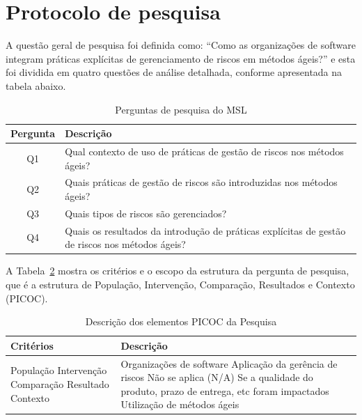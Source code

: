 \documentclass[
	12pt,
	openright,
	twoside,
	a4paper,
	english,
	brazil
	]{abntex2}
\begin{document}
\section{Protocolo de pesquisa}

A questão geral de pesquisa foi definida como: “Como as organizações de software integram práticas explícitas de gerenciamento de riscos em métodos ágeis?” e esta foi dividida em quatro questões de análise detalhada, conforme apresentada na tabela abaixo.

\begin{table}[h!]
  \caption{Perguntas de pesquisa do MSL}
  \centering
  \begin{tabular}{|c|p{10cm}|}
  \hline
  \textbf{Pergunta} & \textbf{Descrição} \\ \hline
  Q1 & Qual contexto de uso de práticas de gestão de riscos nos métodos ágeis? \\ \hline
  Q2 & Quais práticas de gestão de riscos são introduzidas nos métodos ágeis? \\ \hline
  Q3 & Quais tipos de riscos são gerenciados? \\ \hline
  Q4 & Quais os resultados da introdução de práticas explícitas de gestão de riscos nos métodos ágeis? \\ \hline
  \end{tabular}
  \label{tab:perguntas-msl}
\end{table}

A Tabela~\ref{tab:picoc} \cite{kitchenham2007guidelines} mostra os critérios e o escopo da estrutura da pergunta de pesquisa, que é a estrutura de População, Intervenção, Comparação, Resultados e Contexto (PICOC).

\begin{table}[h!]
  \centering
  \caption{Descrição dos elementos PICOC da Pesquisa}
  \begin{tabular}{|p{3cm}|p{12cm}|}
  \hline
  \textbf{Critérios} & \textbf{Descrição} \\ \hline
  População \newline Intervenção \newline Comparação \newline Resultado \newline Contexto 
  & Organizações de software \newline Aplicação da gerência de riscos \newline Não se aplica (N/A) \newline Se a qualidade do produto, prazo de entrega, etc foram impactados \newline Utilização de métodos ágeis \\ \hline
  \end{tabular}
  \label{tab:picoc}
\end{table}
\end{document}
